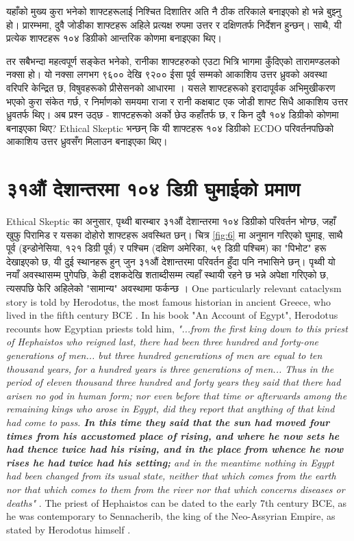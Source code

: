 \documentclass[10pt,twocolumn,letterpaper]{article}
\begin{document}
यहाँको मुख्य कुरा भनेको शाफ्टहरूलाई निश्चित दिशातिर अति नै ठीक तरिकाले बनाइएको हो भन्ने बुझ्नु हो। प्रारम्भमा, दुवै जोडीका शाफ्टहरू अहिले प्रत्यक्ष रुपमा उत्तर र दक्षिणतर्फ निर्देशन हुन्छन्। साथै, यी प्रत्येक शाफ्टहरू १०४ डिग्रीको आन्तरिक कोणमा बनाइएका थिए।

तर सबैभन्दा महत्वपूर्ण सङ्केत भनेको, रानीका शाफ्टहरुको एउटा भित्रि भागमा कुँदिएको तारामण्डलको नक्सा हो। यो नक्सा लगभग ९६०० देखि ९२०० ईसा पूर्व सम्मको आकाशिय उत्तर ध्रुवको अवस्था वरिपरि केन्द्रित छ, विषुवहरूको प्रीसेसनको आधारमा \cite{28}। यसले शाफ्टहरूको इरादापूर्वक अभिमुखीकरण भएको कुरा संकेत गर्छ, र निर्माणको समयमा राजा र रानी कक्षबाट एक जोडी शाफ्ट सिधै आकाशिय उत्तर ध्रुवतर्फ थिए। अब प्रश्न उठ्छ - शाफ्टहरूको अर्को छेउ कहाँतर्फ छ, र किन दुवै १०४ डिग्रीको कोणमा बनाइएका थिए? Ethical Skeptic भन्छन् कि यी शाफ्टहरू १०४ डिग्रीको ECDO परिवर्तनपछिको आकाशिय उत्तर ध्रुवसँग मिलाउन बनाइएका थिए।

\section{३१औं देशान्तरमा १०४ डिग्री घुमाईको प्रमाण}

Ethical Skeptic का अनुसार, पृथ्वी बारम्बार ३१औं देशान्तरमा १०४ डिग्रीको परिवर्तन भोग्छ, जहाँ खुफु पिरामिड र यसका दोहोरो शाफ्टहरू अवस्थित छन्। चित्र \ref{fig:6} मा अनुमान गरिएको घुमाइ, साथै पूर्व (इन्डोनेसिया, १२१ डिग्री पूर्व) र पश्चिम (दक्षिण अमेरिका, ५९ डिग्री पश्चिम) का "पिभोट" हरू देखाइएको छ, यी दुई स्थानहरू हुन् जुन ३१औं देशान्तरमा परिवर्तन हुँदा पनि नभासिने छन्। पृथ्वी यो नयाँ अवस्थासम्म पुगेपछि, केही दशकदेखि शताब्दीसम्म त्यहाँ स्थायी रहने छ भन्ने अपेक्षा गरिएको छ, त्यसपछि फेरि अहिलेको "सामान्य" अवस्थामा फर्कन्छ \cite{150}।
One particularly relevant cataclysm story is told by Herodotus, the most famous historian in ancient Greece, who lived in the fifth century BCE \cite{31}. In his book "An Account of Egypt", Herodotus recounts how Egyptian priests told him, \textit{"...from the first king down to this priest of Hephaistos who reigned last, there had been three hundred and forty-one generations of men... but three hundred generations of men are equal to ten thousand years, for a hundred years is three generations of men... Thus in the period of eleven thousand three hundred and forty years they said that there had arisen no god in human form; nor even before that time or afterwards among the remaining kings who arose in Egypt, did they report that anything of that kind had come to pass. \textbf{In this time they said that the sun had moved four times from his accustomed place of rising, and where he now sets he had thence twice had his rising, and in the place from whence he now rises he had twice had his setting;} and in the meantime nothing in Egypt had been changed from its usual state, neither that which comes from the earth nor that which comes to them from the river nor that which concerns diseases or deaths"} \cite{32}. The priest of Hephaistos can be dated to the early 7th century BCE, as he was contemporary to Sennacherib, the king of the Neo-Assyrian Empire, as stated by Herodotus himself \cite{32,33,34}.
\end{document}

